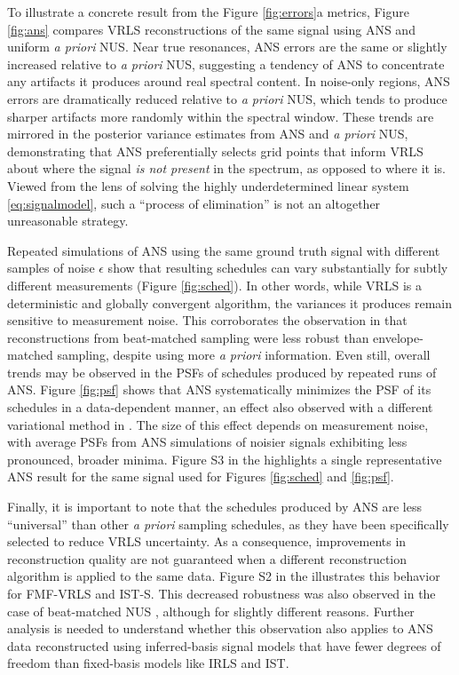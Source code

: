 \documentclass[final,5p,times,twocolumn]{elsarticle}
\begin{document}
To illustrate a concrete result from the Figure \ref{fig:errors}a metrics,
Figure \ref{fig:ans} compares VRLS reconstructions of the same signal
using ANS and uniform \emph{a priori} NUS. Near true resonances, ANS
errors are the same or slightly increased relative to \emph{a priori} NUS,
suggesting a tendency of ANS to concentrate any artifacts it produces
around real spectral content. In noise-only regions, ANS errors are
dramatically reduced relative to \emph{a priori} NUS, which tends to produce
sharper artifacts more randomly within the spectral window. These trends
are mirrored in the posterior variance estimates from ANS and
\emph{a priori} NUS, demonstrating that ANS preferentially selects
grid points that inform VRLS about where the signal \emph{is not present}
in the spectrum, as opposed to where it is. Viewed from the lens of solving
the highly underdetermined linear system \eqref{eq:signalmodel}, such a
``process of elimination'' is not an altogether unreasonable strategy.

Repeated simulations of ANS using the same ground truth signal with
different samples of noise $\epsilon$ show that resulting schedules
can vary substantially for subtly different measurements
(Figure \ref{fig:sched}). In other words, while VRLS is a
deterministic and globally convergent algorithm, the variances it
produces remain sensitive to measurement noise. This corroborates the
observation in \cite{schuyler:jbnmr2011} that reconstructions from
beat-matched sampling were less robust than envelope-matched sampling,
despite using more \emph{a priori} information. Even still, overall
trends may be observed in the PSFs of schedules produced by repeated
runs of ANS. Figure \ref{fig:psf} shows that ANS systematically
minimizes the PSF of its schedules in a data-dependent manner, an
effect also observed with a different variational method in
\cite{worley:cmr2018}. The size of this effect depends on measurement
noise, with average PSFs from ANS simulations of noisier signals
exhibiting less pronounced, broader minima. Figure S3 in the
 highlights a single representative ANS result for the
same signal used for Figures \ref{fig:sched} and \ref{fig:psf}.

Finally, it is important to note that the schedules produced by ANS are
less ``universal'' than other \emph{a priori} sampling schedules, as they
have been specifically selected to reduce VRLS uncertainty. As a consequence,
improvements in reconstruction quality are not guaranteed when a different
reconstruction algorithm is applied to the same data. Figure S2 in the
 illustrates this behavior for FMF-VRLS and IST-S. This
decreased robustness was also observed in the case of beat-matched NUS
\cite{schuyler:jbnmr2011}, although for slightly different reasons. Further
analysis is needed to understand whether this observation also applies to
ANS data reconstructed using inferred-basis signal models that have fewer
degrees of freedom than fixed-basis models like IRLS and IST.
\end{document}
